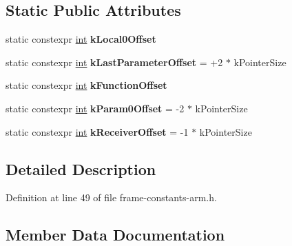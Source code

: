 \subsection*{Static Public Attributes}
\begin{DoxyCompactItemize}
\item 
static constexpr \mbox{\hyperlink{classint}{int}} {\bfseries k\+Local0\+Offset}
\item 
\mbox{\label{classv8_1_1internal_1_1JavaScriptFrameConstants_abad8f71270b3b83503967ecce96115da}} 
static constexpr \mbox{\hyperlink{classint}{int}} {\bfseries k\+Last\+Parameter\+Offset} = +2 $\ast$ k\+Pointer\+Size
\item 
static constexpr \mbox{\hyperlink{classint}{int}} {\bfseries k\+Function\+Offset}
\item 
\mbox{\label{classv8_1_1internal_1_1JavaScriptFrameConstants_a4f0046d2466cfb1677176208f36e5455}} 
static constexpr \mbox{\hyperlink{classint}{int}} {\bfseries k\+Param0\+Offset} = -\/2 $\ast$ k\+Pointer\+Size
\item 
\mbox{\label{classv8_1_1internal_1_1JavaScriptFrameConstants_a51121539006d2b9a70a30df0d878ae36}} 
static constexpr \mbox{\hyperlink{classint}{int}} {\bfseries k\+Receiver\+Offset} = -\/1 $\ast$ k\+Pointer\+Size
\end{DoxyCompactItemize}


\subsection{Detailed Description}


Definition at line 49 of file frame-\/constants-\/arm.\+h.



\subsection{Member Data Documentation}
\mbox{\label{classv8_1_1internal_1_1JavaScriptFrameConstants_a3a5d2a47736b890404cf6338c71e3824}} 
